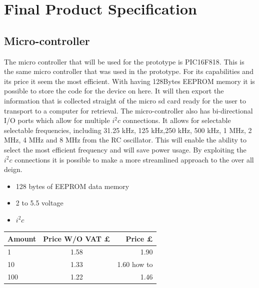\documentclass{report}
\begin{document}
\section{Final Product Specification}

\subsection{Micro-controller}
The micro controller that will be used for the prototype is PIC16F818. This is the same micro controller that was used in the prototype. For its capabilities and its price it seem the most efficient. With having 128Bytes EEPROM memory it is possible to store the code for the device on here. It will then export the information that is collected straight of the micro sd card ready for the user to transport to a computer for retrieval. The micro-controller also has bi-directional I/O ports which allow for multiple $i^2c$ connections. It allows for selectable selectable frequencies, including 31.25 kHz, 125 kHz,250 kHz, 500 kHz, 1 MHz, 2 MHz, 4 MHz and 8 MHz from the RC oscillator. This will enable the ability to select the most efficient frequency and will save power usage. By exploiting the $i^2c$ connections it is possible to make a more streamlined approach to the over all deign.
\begin{itemize}
\item 128 bytes of EEPROM data memory
\item 2 to 5.5 voltage
\item $i^2c$
\end{itemize}
\begin{center}
  \begin{tabular}{ | l | c | r |}
    \hline
    Amount & Price W/O VAT £ & Price £ \\ \hline
    1 & 1.58 & 1.90 \\ \hline
    10 & 1.33 & 1.60 how to\\ \hline
    100 & 1.22 & 1.46   \\ \hline
  \end{tabular}
\end{center}
\end{document}
